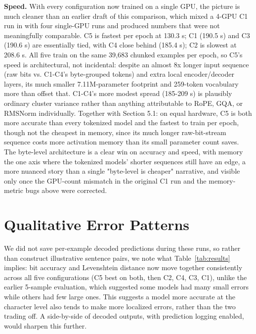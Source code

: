 \documentclass[12pt,a4paper]{article}
\begin{document}
\textbf{Speed.} With every configuration now trained on a single GPU, the picture is much cleaner than an earlier draft of this comparison, which mixed a 4-GPU C1 run in with four single-GPU runs and produced numbers that were not meaningfully comparable. C5 is fastest per epoch at 130.3 s; C1 (190.5 s) and C3 (190.6 s) are essentially tied, with C4 close behind (185.4 s); C2 is slowest at 208.6 s. All five train on the same 39,683 chunked examples per epoch, so C5's speed is architectural, not incidental: despite an almost 8x longer input sequence (raw bits vs. C1-C4's byte-grouped tokens) and extra local encoder/decoder layers, its much smaller 7.11M-parameter footprint and 259-token vocabulary more than offset that. C1-C4's more modest spread (185-209 s) is plausibly ordinary cluster variance rather than anything attributable to RoPE, GQA, or RMSNorm individually. Together with Section 5.1: on equal hardware, C5 is both more accurate than every tokenized model and the fastest to train per epoch, though not the cheapest in memory, since its much longer raw-bit-stream sequence costs more activation memory than its small parameter count saves. The byte-level architecture is a clear win on accuracy and speed, with memory the one axis where the tokenized models' shorter sequences still have an edge, a more nuanced story than a single "byte-level is cheaper" narrative, and visible only once the GPU-count mismatch in the original C1 run and the memory-metric bugs above were corrected.

\section{Qualitative Error Patterns}

We did not save per-example decoded predictions during these runs, so rather than construct illustrative sentence pairs, we note what Table~\ref{tab:results} implies: bit accuracy and Levenshtein distance now move together consistently across all five configurations (C5 best on both, then C2, C4, C3, C1), unlike the earlier 5-sample evaluation, which suggested some models had many small errors while others had few large ones. This suggests a model more accurate at the character level also tends to make more localized errors, rather than the two trading off. A side-by-side of decoded outputs, with prediction logging enabled, would sharpen this further.

\end{document}
